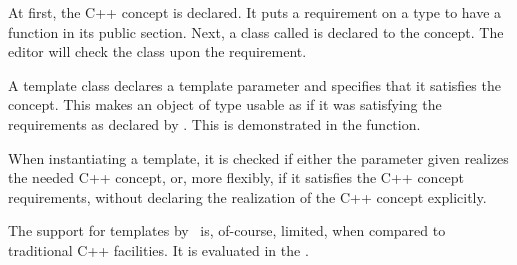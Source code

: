At first, the  C++ concept is declared. It puts a requirement on a type to have a function 
 in its public section.
Next, a class called  is declared to  the  concept. The
editor will check the class upon the requirement.

A template class  declares a template parameter  and specifies that it 
satisfies the  concept. This makes an object of type  usable as if it was 
satisfying the requirements as declared by . This is demonstrated in the 
function.

When instantiating a template, it is checked if either the parameter given realizes the needed 
C++ concept, or, more flexibly, if it satisfies the C++ concept requirements, without declaring
the realization of the C++ concept explicitly.

The support for templates by \pcpp\ is, of-course, limited, when compared to traditional C++ facilities.
It is evaluated in the .
